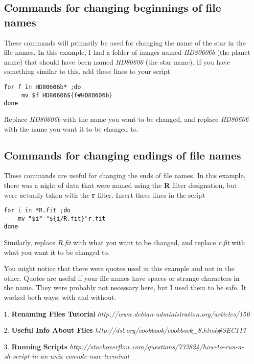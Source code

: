 \documentclass[10pt,preprint]{article}
\begin{document}
\subsection{Commands for changing beginnings of file names}
These commands will primarily be used for changing the name of the star in the file names.  In this example, I had a folder of images named \emph{HD80606b} (the planet name) that should have been named \emph{HD80606} (the star name).  If you have something similar to this, add these lines to your script

\begin{verbatim}
for f in HD80606b* ;do
     mv $f HD80606${f#HD80606b}
done
\end{verbatim}

Replace \emph{HD80606b} with the name you want to be changed, and replace \emph{HD80606} with the name you want it to be changed to.  

\subsection{Commands for changing endings of file names}
These commands are useful for changing the ends of file names.  In this example, there was a night of data that were named using the \textbf{R} filter designation, but were actually taken with the \textbf{r} filter.  Insert these lines in the script

\begin{verbatim}
for i in *R.fit ;do 
    mv "$i" "${i/R.fit}"r.fit
done
\end{verbatim}

Similarly, replace \emph{R.fit} with what you want to be changed, and replace \emph{r.fit} with what you want it to be changed to.  

You might notice that there were quotes used in this example and not in the other.  Quotes are useful if your file names have spaces or strange characters in the name.  They were probably not necessary here, but I used them to be safe.  It worked both ways, with and without.

\begin{thebibliography}{9}

  1. \textbf{Renaming Files Tutorial} \emph{http://www.debian-administration.org/articles/150}

  2. \textbf{Useful Info About Files} \emph{http://dsl.org/cookbook/cookbook\_{}8.html\#{}SEC117}

  3. \textbf{Running Scripts} \emph{http://stackoverflow.com/questions/733824/how-to-run-a-sh-script-in-an-unix-console-mac-terminal}

\end{thebibliography}
\end{document}
